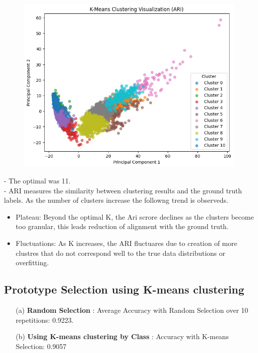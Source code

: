 \documentclass{article}
\begin{document}
\begin{enumerate}
\begin{figure}[H]
\begin{minipage}{0.45\textwidth}
            \includegraphics[width=\textwidth]{Ari_graph.png}
            \label{fig:ari_graph}
        \end{minipage}
    \end{figure}
    - The optimal was 11.\\
    - ARI measures the similarity between clustering results and the ground truth labels. As the number of clusters increase the followng trend is observeds.
    \begin{itemize}
        \item Plateau: Beyond the optimal K, the Ari scrore declines as the clusters become too granular, this leads reduction of alignment with the ground truth.
        \item Fluctuations: As K increases, the ARI fluctuares due to creation of more clustres that do not correspond well to the true data distributions or overfitting.
    \end{itemize}
\end{enumerate}

\subsection{Prototype Selection using K-means clustering}
\begin{enumerate}
    \item [(a)] \textbf{Random Selection} : Average Accuracy with Random Selection over 10 repetitions: 0.9223.
    \item [(b)] \textbf{Using K-means clustering by Class} : Accuracy with K-means Selection: 0.9057
\end{enumerate}
\end{document}
